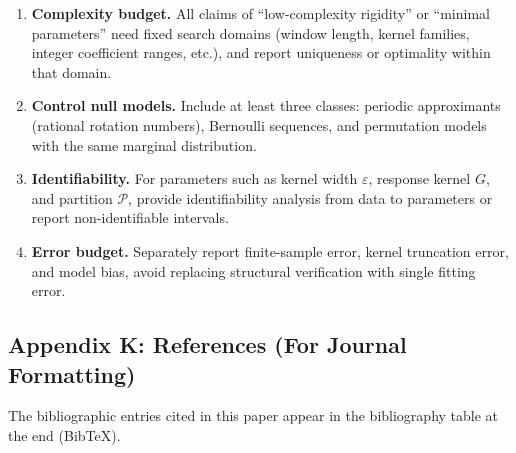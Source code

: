 \begin{enumerate}
  \item \textbf{Complexity budget.} All claims of ``low-complexity rigidity'' or ``minimal parameters'' need fixed search domains (window length, kernel families, integer coefficient ranges, etc.), and report uniqueness or optimality within that domain.
  \item \textbf{Control null models.} Include at least three classes: periodic approximants (rational rotation numbers), Bernoulli sequences, and permutation models with the same marginal distribution.
  \item \textbf{Identifiability.} For parameters such as kernel width $\varepsilon$, response kernel $G$, and partition $\mathcal{P}$, provide identifiability analysis from data to parameters or report non-identifiable intervals.
  \item \textbf{Error budget.} Separately report finite-sample error, kernel truncation error, and model bias, avoid replacing structural verification with single fitting error.
\end{enumerate}

\subsection{Appendix K: References (For Journal Formatting)}
\label{app:refs}

The bibliographic entries cited in this paper appear in the bibliography table at the end (Bib\TeX{}).

